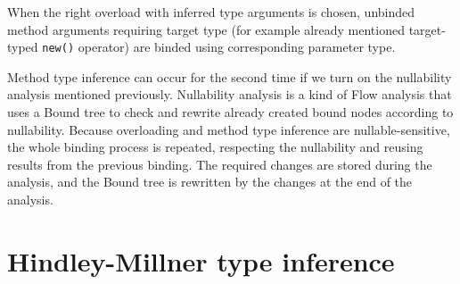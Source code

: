 When the right overload with inferred type arguments is chosen, unbinded method arguments requiring target type (for example already mentioned target-typed \texttt{new()} operator) are binded using corresponding parameter type.
\par
{}
Method type inference can occur for the second time if we turn on the nullability analysis mentioned previously. 
Nullability analysis is a kind of Flow analysis that uses a Bound tree to check and rewrite already created bound nodes according to nullability. 
Because overloading and method type inference are nullable-sensitive, the whole binding process is repeated, respecting the nullability and reusing results from the previous binding. 
The required changes are stored during the analysis, and the Bound tree is rewritten by the changes at the end of the analysis.

\section{Hindley-Millner type inference}

